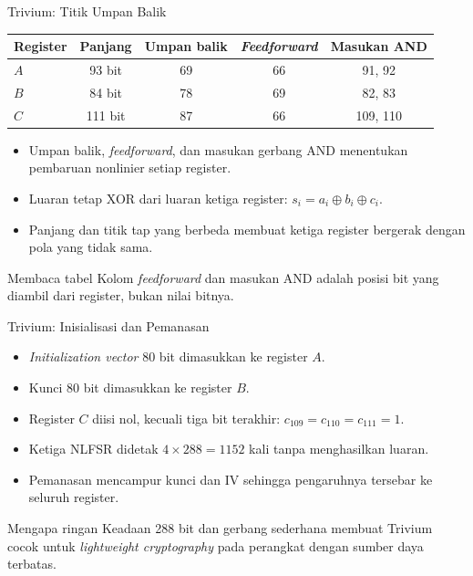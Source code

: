 \documentclass[aspectratio=169,11pt]{beamer}
\begin{document}
\begin{frame}{Trivium: Titik Umpan Balik}
    \footnotesize
    \begin{center}
        \scriptsize
        \begin{tabular}{@{}lcccc@{}}
            \toprule
            Register & Panjang & Umpan balik & \textit{Feedforward} & Masukan AND \\
            \midrule
            $A$ & 93 bit  & 69 & 66 & 91, 92 \\
            $B$ & 84 bit  & 78 & 69 & 82, 83 \\
            $C$ & 111 bit & 87 & 66 & 109, 110 \\
            \bottomrule
        \end{tabular}
    \end{center}
    \vspace{0.1cm}
    \begin{itemize}
        \item Umpan balik, \textit{feedforward}, dan masukan gerbang AND
              menentukan pembaruan nonlinier setiap register.
        \item Luaran tetap XOR dari luaran ketiga register:
              $s_i=a_i\oplus b_i\oplus c_i$.
        \item Panjang dan titik tap yang berbeda membuat ketiga register
              bergerak dengan pola yang tidak sama.
    \end{itemize}
    \begin{block}{Membaca tabel}
        Kolom \textit{feedforward} dan masukan AND adalah posisi bit yang
        diambil dari register, bukan nilai bitnya.
    \end{block}
\end{frame}

\begin{frame}{Trivium: Inisialisasi dan Pemanasan}
    \footnotesize
    \begin{itemize}
        \item \textit{Initialization vector} 80 bit dimasukkan ke register
              $A$.
        \item Kunci 80 bit dimasukkan ke register $B$.
        \item Register $C$ diisi nol, kecuali tiga bit terakhir:
              $c_{109}=c_{110}=c_{111}=1$.
        \item Ketiga NLFSR didetak $4\times288=1152$ kali tanpa
              menghasilkan luaran.
        \item Pemanasan mencampur kunci dan IV sehingga pengaruhnya
              tersebar ke seluruh register.
    \end{itemize}
    \begin{exampleblock}{Mengapa ringan}
        Keadaan 288 bit dan gerbang sederhana membuat Trivium cocok untuk
        \textit{lightweight cryptography} pada perangkat dengan sumber
        daya terbatas.
    \end{exampleblock}
\end{frame}
\end{document}
